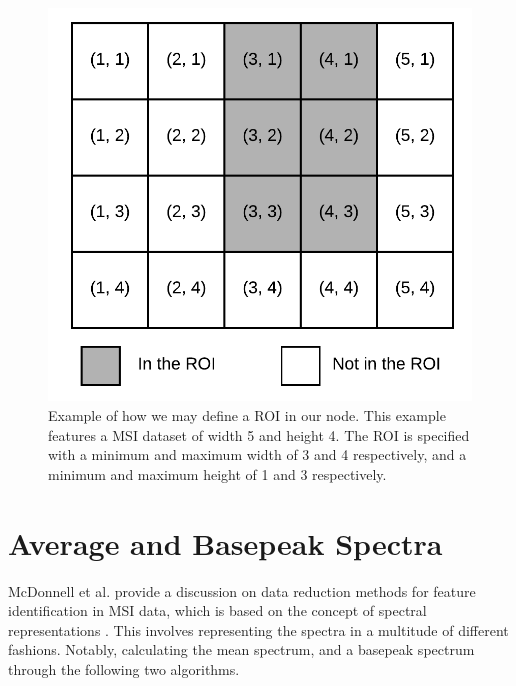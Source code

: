\documentclass[11pt,openany]{book}
\begin{document}
\begin{figure}[H]
    \centering
    \includegraphics[scale=0.8]{./images/ROI.png}
    \caption{Example of how we may define a ROI in our node. This example features a MSI dataset of width 5 and height 4. The ROI is specified with a minimum  and maximum width of 3 and 4 respectively, and a minimum and maximum height of 1 and 3 respectively.}
    \label{fig:ROI_Image}
\end{figure}

\section{Average and Basepeak Spectra}
McDonnell et al. provide a discussion on data reduction methods for feature identification in MSI data, which is based on the concept of spectral representations \cite{mean_basepeak_spectrum_MSI}. This involves representing the spectra in a multitude of different fashions. Notably, calculating the mean spectrum, and a basepeak spectrum through the following two algorithms. 

\end{document}
